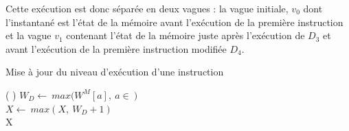 Cette exécution est donc séparée en deux vagues : la vague initiale, $v_0$ dont l'instantané est l'état de la mémoire avant l'exécution de la première instruction et la vague $v_1$ contenant l'état de la mémoire juste après l'exécution de $D_3$ et avant l'exécution de la première instruction modifiée $D_4$.




\begin{algorithm}[h] %
\caption{Mise à jour du niveau d'exécution d'une instruction}
\SetAlgoLined
{}
\Fn(
){}{
$W_D \leftarrow\ max(W^M[a],\ a\in\ $$)$\\
$X \leftarrow\ max(X,\ W_D+1)$ \\
\Return X
}
\label{algo:update_exec_level}
\end{algorithm}

